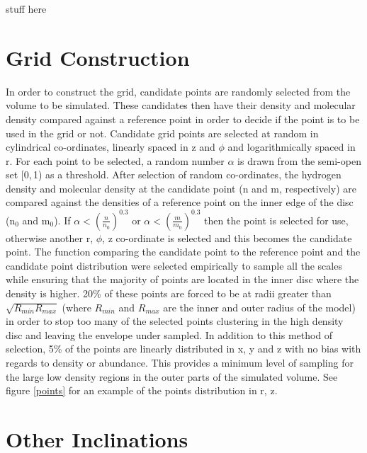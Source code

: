 \documentclass[useAMS,usenatbib]{mn2e}
\begin{document}
stuff here
\newpage

\appendix

\section{Grid Construction} \label{sec:gridding} 

In order to construct the grid, candidate points are randomly selected from the volume to be simulated. These candidates then have their density and molecular density compared against a reference point in order to decide if the point is to be used in the grid or not. Candidate grid points are selected at random in cylindrical co-ordinates, linearly spaced in z and $\phi$ and logarithmically spaced in r. For each point to be selected, a random number $\alpha$ is drawn from the semi-open set [0,$\,$1) as a threshold. After selection of random co-ordinates, the hydrogen density and molecular density at the candidate point (n and m, respectively) are compared against the densities of a reference point on the inner edge of the disc (n$_0$ and m$_0$). If $\alpha<\left( \frac{n}{n_0} \right)^{0.3}$ or $\alpha< \left( \frac{m}{m_0} \right)^{0.3}$ then the point is selected for use, otherwise another r, $\phi$, z co-ordinate is selected and this becomes the candidate point. The function comparing the candidate point to the reference point and the candidate point distribution were selected empirically to sample all the scales while ensuring that the majority of points are located in the inner disc where the density is higher. 20\% of these points are forced to be at radii greater than $\sqrt{R_{min}R_{max}}$ (where $R_{min}$ and $R_{max}$ are the inner and outer radius of the model) in order to stop too many of the selected points clustering in the high density disc and leaving the envelope under sampled. In addition to this method of selection, 5\% of the points are linearly distributed in x, y and z with no bias with regards to density or abundance. This provides a minimum level of sampling for the large low density regions in the outer parts of the simulated volume. See figure \ref{points} for an example of the points distribution in r, z. \newline


\section[]{Other Inclinations}
\end{document}
